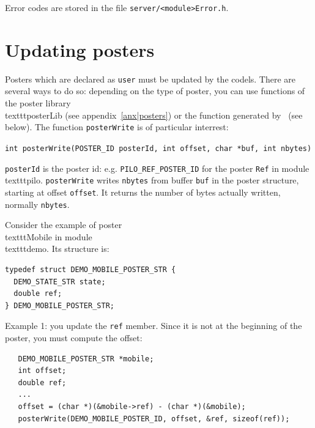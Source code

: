 Error codes are stored in the file \texttt{server/<module>Error.h}.



\section{Updating posters}

Posters which are  declared as \texttt{user}  must be updated by the codels.
There are several ways to do so: depending on the type of poster, you can
use  functions of    the      poster  library \\texttt{posterLib}      (see
appendix~\ref{anx|posters}) or   the function  generated by \GenoM\  (see
below).  The function \texttt{posterWrite} is of particular interrest:

\bigbreak
\texttt{int posterWrite(POSTER\_ID posterId, int offset, char *buf, int nbytes)}
\bigbreak

\texttt{posterId} is the poster id: e.g. \texttt{PILO\_REF\_POSTER\_ID} for the
poster \texttt{Ref} in  module \\texttt{pilo}.   \texttt{posterWrite} writes  
\texttt{nbytes} from buffer \texttt{buf} in the poster structure, starting at offset
\texttt{offset}.  It returns the  number of bytes actually written, normally
\texttt{nbytes}.

\bigbreak

Consider the example  of poster \\texttt{Mobile} in module \\texttt{demo}. Its
structure is:

\begin{center}\begin{cartouche}\small\begin{verbatim}
typedef struct DEMO_MOBILE_POSTER_STR {
  DEMO_STATE_STR state;
  double ref;
} DEMO_MOBILE_POSTER_STR;
\end{verbatim}\end{cartouche}\end{center}
\label{typedef|demomobile}

Example 1: you update the \texttt{ref} member. Since it is not at the
beginning of the poster, you must compute the offset:

\begin{center}\begin{cartouche}\small\begin{verbatim}
   DEMO_MOBILE_POSTER_STR *mobile;
   int offset;
   double ref;
   ...
   offset = (char *)(&mobile->ref) - (char *)(&mobile);
   posterWrite(DEMO_MOBILE_POSTER_ID, offset, &ref, sizeof(ref));
\end{verbatim}\end{cartouche}\end{center}

